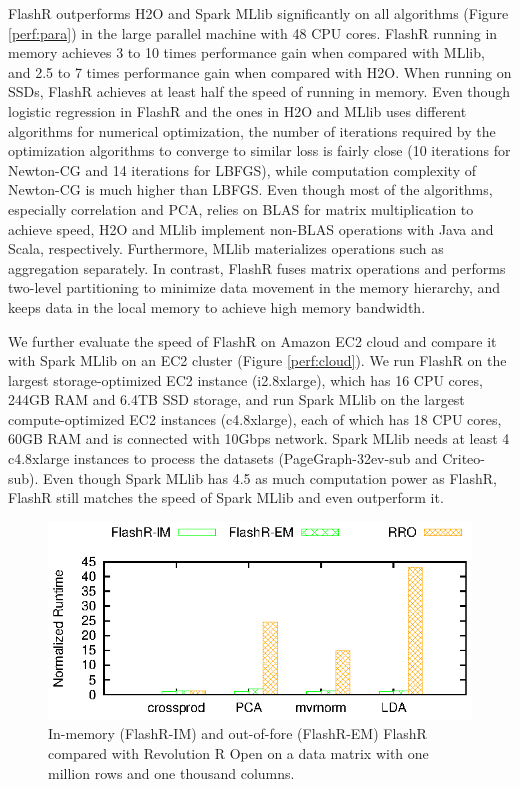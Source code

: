 FlashR outperforms H2O and Spark MLlib significantly on all algorithms
(Figure \ref{perf:para}) in the large parallel machine with 48 CPU cores.
FlashR running in memory achieves 3 to 10 times performance gain when compared
with MLlib, and 2.5 to 7 times performance gain when compared with H2O.
When running on SSDs, FlashR achieves at least half the speed of running in
memory. Even though logistic regression in FlashR and the ones in H2O and MLlib
uses different algorithms for numerical optimization, the number of iterations
required by the optimization algorithms to converge to similar loss is fairly
close (10 iterations for Newton-CG and 14 iterations for LBFGS), while computation
complexity of Newton-CG is much higher than LBFGS.
Even though most of the algorithms, especially correlation and PCA,
relies on BLAS for matrix multiplication to achieve speed, H2O and MLlib
implement non-BLAS operations with Java and Scala, respectively. Furthermore,
MLlib materializes operations such as aggregation separately. In contrast,
FlashR fuses matrix operations and performs two-level partitioning to
minimize data movement in the memory hierarchy, and keeps data in the local
memory to achieve high memory bandwidth.

We further evaluate the speed of FlashR on Amazon EC2 cloud and compare it with
Spark MLlib on an EC2 cluster (Figure \ref{perf:cloud}). We run FlashR on
the largest storage-optimized
EC2 instance (i2.8xlarge), which has 16 CPU cores, 244GB RAM and 6.4TB SSD storage,
and run Spark MLlib on the largest compute-optimized EC2 instances (c4.8xlarge),
each of which has 18 CPU cores, 60GB RAM and is connected with 10Gbps network.
Spark MLlib needs at least 4 c4.8xlarge instances to process the datasets
(PageGraph-32ev-sub and Criteo-sub).
Even though Spark MLlib has 4.5 as much computation power as FlashR, FlashR
still matches the speed of Spark MLlib and even outperform it.

\begin{figure}[b]
  \vspace{-10pt}
	\begin{center}
		\footnotesize
		\includegraphics{FlashMatrix_figs/FlashR-vs-RRO.eps}
		\caption{In-memory (FlashR-IM) and out-of-fore (FlashR-EM) FlashR
		compared with Revolution R Open on a data matrix with one million rows
		and one thousand columns.}
		\label{fig:fmR}
	\end{center}
  \vspace{-15pt}
\end{figure}

